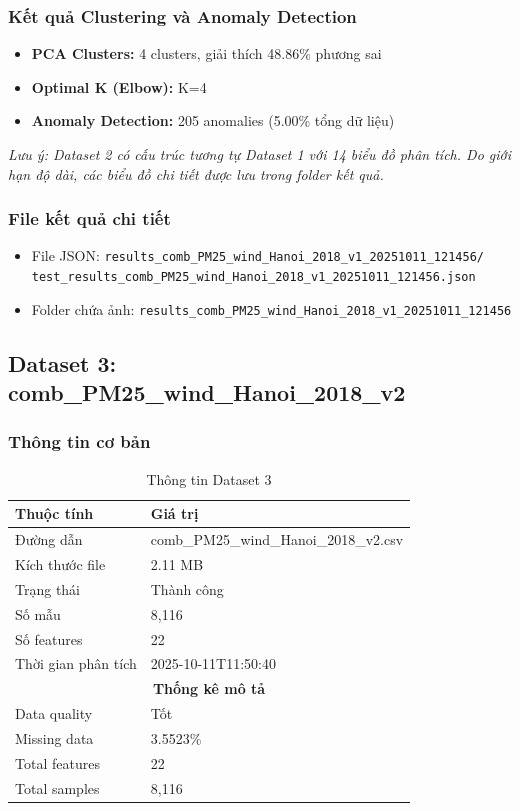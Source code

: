 \documentclass[12pt,a4paper]{article}
\begin{document}
\subsubsection{Kết quả Clustering và Anomaly Detection}
\begin{itemize}
    \item \textbf{PCA Clusters:} 4 clusters, giải thích 48.86\% phương sai
    \item \textbf{Optimal K (Elbow):} K=4
    \item \textbf{Anomaly Detection:} 205 anomalies (5.00\% tổng dữ liệu)
\end{itemize}

\textit{Lưu ý: Dataset 2 có cấu trúc tương tự Dataset 1 với 14 biểu đồ phân tích. Do giới hạn độ dài, các biểu đồ chi tiết được lưu trong folder kết quả.}

\subsubsection{File kết quả chi tiết}
\begin{itemize}
    \item File JSON: \texttt{results\_comb\_PM25\_wind\_Hanoi\_2018\_v1\_20251011\_121456/}\\
    \texttt{test\_results\_comb\_PM25\_wind\_Hanoi\_2018\_v1\_20251011\_121456.json}
    \item Folder chứa ảnh: \texttt{results\_comb\_PM25\_wind\_Hanoi\_2018\_v1\_20251011\_121456}
\end{itemize}

\newpage
\subsection{Dataset 3: comb\_PM25\_wind\_Hanoi\_2018\_v2}

\subsubsection{Thông tin cơ bản}
\begin{table}[H]
\centering
\begin{tabular}{ll}
\toprule
\textbf{Thuộc tính} & \textbf{Giá trị}\\
\midrule
Đường dẫn & comb\_PM25\_wind\_Hanoi\_2018\_v2.csv\\
Kích thước file & 2.11 MB\\
Trạng thái & \textcolor{successcolor}{Thành công}\\
Số mẫu & 8,116\\
Số features & 22\\
Thời gian phân tích & 2025-10-11T11:50:40\\
\midrule
\multicolumn{2}{c}{\textbf{Thống kê mô tả}}\\
\midrule
Data quality & Tốt\\
Missing data & 3.5523\%\\
Total features & 22\\
Total samples & 8,116\\
\bottomrule
\end{tabular}
\caption{Thông tin Dataset 3}
\end{table}
\end{document}
